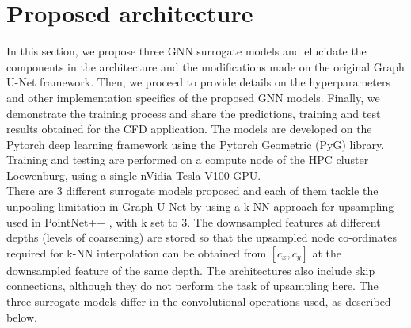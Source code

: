 \section{Proposed architecture}
\label{proparch}
In this section, we propose three GNN surrogate models and elucidate the components in the architecture and the modifications made on the original Graph U-Net framework. Then, we proceed to provide details on the hyperparameters and other implementation specifics of the proposed GNN models. Finally, we demonstrate the training process and share the predictions, training and test results obtained for the CFD application. The models are developed on the Pytorch deep learning framework using the Pytorch Geometric (PyG) library. Training and testing are performed on a compute node of the \gls{HPC} cluster Loewenburg, using a single nVidia Tesla V100 GPU. \\
There are 3 different surrogate models proposed and each of them tackle the unpooling limitation in Graph U-Net by using a \gls{k-NN} approach for upsampling used in PointNet++ \cite{pnpp}, with k set to 3. The downsampled features at different depths (levels of coarsening) are stored so that the upsampled node co-ordinates required for k-NN interpolation can be obtained from $[c_{x}, c_{y}]$ at the downsampled feature of the same depth. The architectures also include skip connections, although they do not perform the task of upsampling here. The three surrogate models differ in the convolutional operations used, as described below. 
